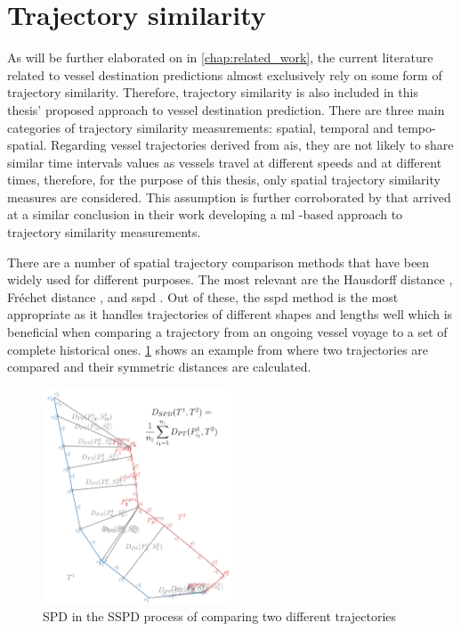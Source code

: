 \section{Trajectory similarity}

As will be further elaborated on in \cref{chap:related_work}, the current literature related to vessel destination predictions almost exclusively rely on some form of trajectory similarity. Therefore, trajectory similarity is also included in this thesis' proposed approach to vessel destination prediction. There are three main categories of trajectory similarity measurements: spatial, temporal and tempo-spatial. Regarding vessel trajectories derived from \acrshort{ais}, they are not likely to share similar time intervals values as vessels travel at different speeds and at different times, therefore, for the purpose of this thesis, only spatial trajectory similarity measures are considered. This assumption is further corroborated by \cite{Zhang2020AISApproach} that arrived at a similar conclusion in their work developing a \acrfull{ml} -based approach to trajectory similarity measurements.

There are a number of spatial trajectory comparison methods that have been widely used for different purposes. The most relevant are the Hausdorff distance \parencite{magdy2015}, Fréchet distance \parencite{magdy2015}, and \acrfull{sspd} \parencite{besse2015review}. Out of these, the \acrshort{sspd} method is the most appropriate as it handles trajectories of different shapes and lengths well which is beneficial when comparing a trajectory from an ongoing vessel voyage to a set of complete historical ones. \cref{fig:sspd} shows an example from \cite{besse2015review} where two trajectories are compared and their symmetric distances are calculated.

\begin{figure}[htbp]  %
    \centering
    \includegraphics[width=0.5\textwidth]{figures/sspd}
    \caption{SPD in the SSPD process of comparing two different trajectories \parencite{besse2015review}}
    \label{fig:sspd}
\end{figure}

